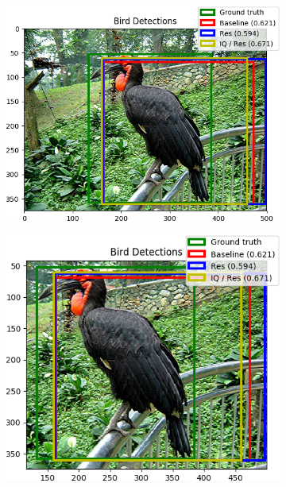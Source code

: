 \begin{figure}[H]
    \centering
    \begin{subfigure}[b]{0.45\textwidth}
        \center
        \includegraphics[width=\textwidth]{Figs/Results/000057res.png}
        \caption{}\label{fig:}
    \end{subfigure}
    \begin{subfigure}[b]{0.45\textwidth}
        \center
        \includegraphics[width=\textwidth]{Figs/Results/000057reszoom.png}
        \caption{}\label{fig:}
    \end{subfigure}
    \caption{}
    \label{fig:}
\end{figure} 


